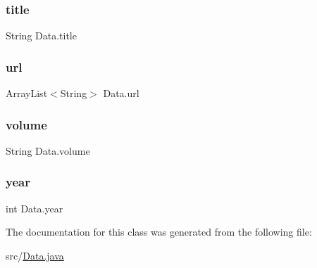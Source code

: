 \hypertarget{class_data_adcd725740eb6c1b70d03d51bcdaa4fc4}{}\label{class_data_adcd725740eb6c1b70d03d51bcdaa4fc4} 
\subsubsection{\texorpdfstring{title}{title}}
{\footnotesize\ttfamily String Data.\+title\hspace{0.3cm}{\ttfamily [private]}}

\hypertarget{class_data_a41462839c5b625313952cf2155da2175}{}\label{class_data_a41462839c5b625313952cf2155da2175} 
\subsubsection{\texorpdfstring{url}{url}}
{\footnotesize\ttfamily Array\+List$<$String$>$ Data.\+url\hspace{0.3cm}{\ttfamily [private]}}

\hypertarget{class_data_aaf6320f6222ab00af52f1cd0d0c301e6}{}\label{class_data_aaf6320f6222ab00af52f1cd0d0c301e6} 
\subsubsection{\texorpdfstring{volume}{volume}}
{\footnotesize\ttfamily String Data.\+volume\hspace{0.3cm}{\ttfamily [private]}}

\hypertarget{class_data_ab4b8026b8e14d7b834aa265bf1221cae}{}\label{class_data_ab4b8026b8e14d7b834aa265bf1221cae} 
\subsubsection{\texorpdfstring{year}{year}}
{\footnotesize\ttfamily int Data.\+year\hspace{0.3cm}{\ttfamily [private]}}



The documentation for this class was generated from the following file\+:\begin{DoxyCompactItemize}
\item 
src/\hyperlink{_data_8java}{Data.\+java}\end{DoxyCompactItemize}
